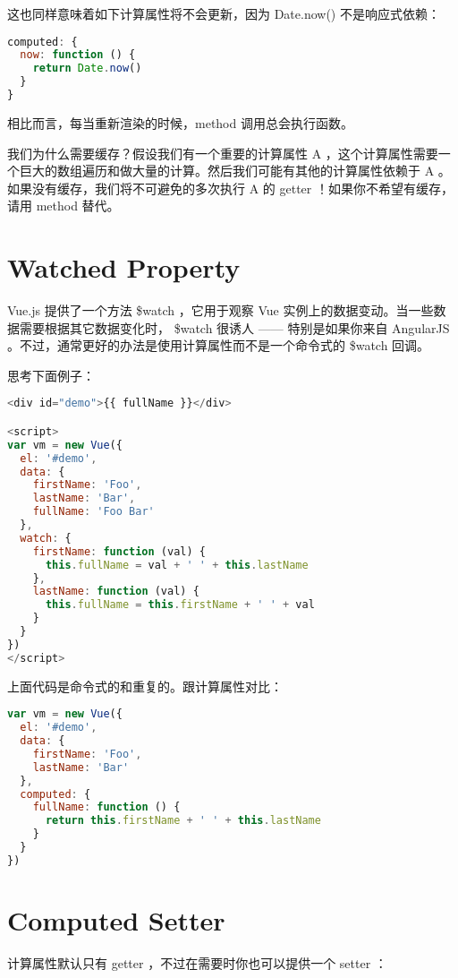 这也同样意味着如下计算属性将不会更新，因为 Date.now() 不是响应式依赖：

\begin{lstlisting}[language=JavaScript]
computed: {
  now: function () {
    return Date.now()
  }
}
\end{lstlisting}

相比而言，每当重新渲染的时候，method 调用总会执行函数。

我们为什么需要缓存？假设我们有一个重要的计算属性 A ，这个计算属性需要一个巨大的数组遍历和做大量的计算。然后我们可能有其他的计算属性依赖于 A 。如果没有缓存，我们将不可避免的多次执行 A 的 getter ！如果你不希望有缓存，请用 method 替代。

\section{Watched Property}

Vue.js 提供了一个方法 \$watch ，它用于观察 Vue 实例上的数据变动。当一些数据需要根据其它数据变化时， \$watch 很诱人 —— 特别是如果你来自 AngularJS 。不过，通常更好的办法是使用计算属性而不是一个命令式的 \$watch 回调。

思考下面例子：

\begin{lstlisting}[language=JavaScript]
<div id="demo">{{ fullName }}</div>

<script>
var vm = new Vue({
  el: '#demo',
  data: {
    firstName: 'Foo',
    lastName: 'Bar',
    fullName: 'Foo Bar'
  },
  watch: {
    firstName: function (val) {
      this.fullName = val + ' ' + this.lastName
    },
    lastName: function (val) {
      this.fullName = this.firstName + ' ' + val
    }
  }
})
</script>
\end{lstlisting}

上面代码是命令式的和重复的。跟计算属性对比：

\begin{lstlisting}[language=JavaScript]
var vm = new Vue({
  el: '#demo',
  data: {
    firstName: 'Foo',
    lastName: 'Bar'
  },
  computed: {
    fullName: function () {
      return this.firstName + ' ' + this.lastName
    }
  }
})
\end{lstlisting}

\section{Computed Setter}

计算属性默认只有 getter ，不过在需要时你也可以提供一个 setter ：


